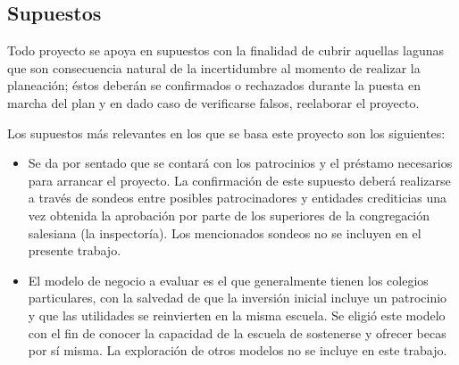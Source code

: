 


\subsection{Supuestos}
\label{sub:Supuestos}


Todo proyecto se apoya en supuestos con la finalidad de cubrir aquellas lagunas que son consecuencia natural de la incertidumbre al momento de realizar la planeación; éstos deberán se confirmados o rechazados durante la puesta en marcha del plan y en dado caso de verificarse falsos, reelaborar el proyecto.

Los supuestos más relevantes en los que se basa este proyecto son los siguientes:

\begin{itemize}
	\item Se da por sentado que se contará con los patrocinios y el préstamo necesarios para arrancar el proyecto. La confirmación de este supuesto deberá realizarse a través de sondeos entre posibles patrocinadores y entidades crediticias una vez obtenida la aprobación por parte de los superiores de la congregación salesiana (la inspectoría). Los mencionados sondeos no se incluyen en el presente trabajo.
	\item El modelo de negocio a evaluar es el que generalmente tienen los colegios particulares, con la salvedad de que la inversión inicial incluye un patrocinio y que las utilidades se reinvierten en la misma escuela. Se eligió este modelo con el fin de conocer la capacidad de la escuela de sostenerse y ofrecer becas por sí misma. La exploración de otros modelos no se incluye en este trabajo.
\end{itemize}

